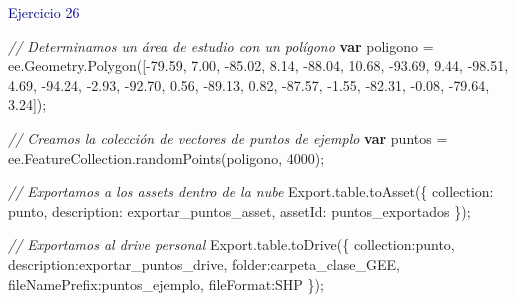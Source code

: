 \documentclass[
  12pt,
  letterpaper,
  twoside]{book}
\newenvironment{Shaded}{\begin{snugshade}}{\end{snugshade}}
\newcommand{\AttributeTok}[1]{\textcolor[rgb]{0.48,0.12,0.64}{#1}}
\newcommand{\CommentTok}[1]{\textcolor[rgb]{0.24,0.58,0.00}{\textit{#1}}}
\newcommand{\DataTypeTok}[1]{\textcolor[rgb]{0.00,0.00,0.00}{#1}}
\newcommand{\DecValTok}[1]{\textcolor[rgb]{0.28,0.53,0.93}{#1}}
\newcommand{\FloatTok}[1]{\textcolor[rgb]{0.28,0.53,0.93}{#1}}
\newcommand{\FunctionTok}[1]{\textcolor[rgb]{0.48,0.12,0.64}{#1}}
\newcommand{\KeywordTok}[1]{\textcolor[rgb]{0.00,0.00,0.00}{\textbf{#1}}}
\newcommand{\NormalTok}[1]{#1}
\newcommand{\OperatorTok}[1]{\textcolor[rgb]{0.00,0.00,0.00}{#1}}
\newcommand{\StringTok}[1]{\textcolor[rgb]{0.87,0.29,0.22}{#1}}
\begin{document}
\textcolor{darkblue}{Ejercicio 26}

\begin{Shaded}
\begin{Highlighting}[]
\CommentTok{// Determinamos un área de estudio con un polígono}
\KeywordTok{var}\NormalTok{ poligono }\OperatorTok{=}\NormalTok{ ee}\OperatorTok{.}\AttributeTok{Geometry}\OperatorTok{.}\FunctionTok{Polygon}\NormalTok{([}\OperatorTok{{-}}\FloatTok{79.59}\OperatorTok{,} \FloatTok{7.00}\OperatorTok{,}
          \OperatorTok{{-}}\FloatTok{85.02}\OperatorTok{,} \FloatTok{8.14}\OperatorTok{,}
          \OperatorTok{{-}}\FloatTok{88.04}\OperatorTok{,} \FloatTok{10.68}\OperatorTok{,}
          \OperatorTok{{-}}\FloatTok{93.69}\OperatorTok{,} \FloatTok{9.44}\OperatorTok{,}
          \OperatorTok{{-}}\FloatTok{98.51}\OperatorTok{,} \FloatTok{4.69}\OperatorTok{,}
          \OperatorTok{{-}}\FloatTok{94.24}\OperatorTok{,} \OperatorTok{{-}}\FloatTok{2.93}\OperatorTok{,}
          \OperatorTok{{-}}\FloatTok{92.70}\OperatorTok{,} \FloatTok{0.56}\OperatorTok{,}
          \OperatorTok{{-}}\FloatTok{89.13}\OperatorTok{,} \FloatTok{0.82}\OperatorTok{,}
          \OperatorTok{{-}}\FloatTok{87.57}\OperatorTok{,} \OperatorTok{{-}}\FloatTok{1.55}\OperatorTok{,}
          \OperatorTok{{-}}\FloatTok{82.31}\OperatorTok{,} \OperatorTok{{-}}\FloatTok{0.08}\OperatorTok{,}
          \OperatorTok{{-}}\FloatTok{79.64}\OperatorTok{,} \FloatTok{3.24}\NormalTok{])}\OperatorTok{;}

\CommentTok{// Creamos la colección de vectores de puntos de ejemplo}
\KeywordTok{var}\NormalTok{ puntos }\OperatorTok{=}\NormalTok{ ee}\OperatorTok{.}\AttributeTok{FeatureCollection}\OperatorTok{.}\FunctionTok{randomPoints}\NormalTok{(poligono}\OperatorTok{,} \DecValTok{4000}\NormalTok{)}\OperatorTok{;}

\CommentTok{// Exportamos a los assets dentro de la nube}
\NormalTok{Export}\OperatorTok{.}\AttributeTok{table}\OperatorTok{.}\FunctionTok{toAsset}\NormalTok{(\{}
  \DataTypeTok{collection}\OperatorTok{:}\NormalTok{ punto}\OperatorTok{,}
  \DataTypeTok{description}\OperatorTok{:} \StringTok{\textquotesingle{}exportar\_puntos\_asset\textquotesingle{}}\OperatorTok{,}
  \DataTypeTok{assetId}\OperatorTok{:} \StringTok{\textquotesingle{}puntos\_exportados\textquotesingle{}}
\NormalTok{\})}\OperatorTok{;}

\CommentTok{// Exportamos al drive personal}
\NormalTok{Export}\OperatorTok{.}\AttributeTok{table}\OperatorTok{.}\FunctionTok{toDrive}\NormalTok{(\{}
  \DataTypeTok{collection}\OperatorTok{:}\NormalTok{punto}\OperatorTok{,} 
  \DataTypeTok{description}\OperatorTok{:}\StringTok{\textquotesingle{}exportar\_puntos\_drive\textquotesingle{}}\OperatorTok{,}
  \DataTypeTok{folder}\OperatorTok{:}\StringTok{\textquotesingle{}carpeta\_clase\_GEE\textquotesingle{}}\OperatorTok{,}
  \DataTypeTok{fileNamePrefix}\OperatorTok{:}\StringTok{\textquotesingle{}puntos\_ejemplo\textquotesingle{}}\OperatorTok{,}
  \DataTypeTok{fileFormat}\OperatorTok{:}\StringTok{\textquotesingle{}SHP\textquotesingle{}}
\NormalTok{\})}\OperatorTok{;}
\end{Highlighting}
\end{Shaded}
\end{document}
